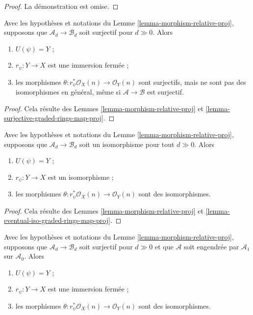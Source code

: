 \begin{proof}
La démonstration est omise.
\end{proof}

\begin{lemma}
\label{lemma-surjective-graded-rings-map-relative-proj}
Avec les hypothèses et notations du Lemme \ref{lemma-morphism-relative-proj},
supposons que $\mathcal{A}_d \to \mathcal{B}_d$ soit surjectif pour
$d \gg 0$. Alors
\begin{enumerate}
\item $U(\psi) = Y$ ;
\item $r_\psi : Y \to X$ est une immersion fermée ;
\item les morphismes $\theta : r_\psi^*\mathcal{O}_X(n) \to \mathcal{O}_Y(n)$
sont surjectifs, mais ne sont pas des isomorphismes en général, même si
$\mathcal{A} \to \mathcal{B}$ est surjectif.
\end{enumerate}
\end{lemma}

\begin{proof}
Cela résulte des Lemmes \ref{lemma-morphism-relative-proj} et
\ref{lemma-surjective-graded-rings-map-proj}.
\end{proof}

\begin{lemma}
\label{lemma-eventual-iso-graded-rings-map-relative-proj}
Avec les hypothèses et notations du Lemme \ref{lemma-morphism-relative-proj},
supposons que $\mathcal{A}_d \to \mathcal{B}_d$ soit un isomorphisme pour
tout $d \gg 0$. Alors
\begin{enumerate}
\item $U(\psi) = Y$ ;
\item $r_\psi : Y \to X$ est un isomorphisme ;
\item les morphismes $\theta : r_\psi^*\mathcal{O}_X(n) \to \mathcal{O}_Y(n)$
sont des isomorphismes.
\end{enumerate}
\end{lemma}

\begin{proof}
Cela résulte des Lemmes \ref{lemma-morphism-relative-proj} et
\ref{lemma-eventual-iso-graded-rings-map-proj}.
\end{proof}

\begin{lemma}
\label{lemma-surjective-generated-degree-1-map-relative-proj}
Avec les hypothèses et notations du Lemme \ref{lemma-morphism-relative-proj},
supposons que $\mathcal{A}_d \to \mathcal{B}_d$ soit surjectif pour
$d \gg 0$ et que $\mathcal{A}$ soit engendrée par $\mathcal{A}_1$ sur
$\mathcal{A}_0$. Alors
\begin{enumerate}
\item $U(\psi) = Y$ ;
\item $r_\psi : Y \to X$ est une immersion fermée ;
\item les morphismes $\theta : r_\psi^*\mathcal{O}_X(n) \to \mathcal{O}_Y(n)$
sont des isomorphismes.
\end{enumerate}
\end{lemma}

